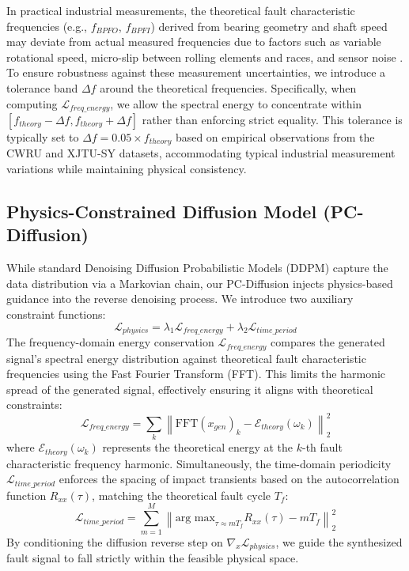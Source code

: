 In practical industrial measurements, the theoretical fault characteristic frequencies (e.g., $f_{BPFO}$, $f_{BPFI}$) derived from bearing geometry and shaft speed may deviate from actual measured frequencies due to factors such as variable rotational speed, micro-slip between rolling elements and races, and sensor noise \cite{randall2011rolling}. To ensure robustness against these measurement uncertainties, we introduce a tolerance band $\Delta f$ around the theoretical frequencies. Specifically, when computing $\mathcal{L}_{freq\_energy}$, we allow the spectral energy to concentrate within $[f_{theory} - \Delta f, f_{theory} + \Delta f]$ rather than enforcing strict equality. This tolerance is typically set to $\Delta f = 0.05 \times f_{theory}$ based on empirical observations from the CWRU and XJTU-SY datasets, accommodating typical industrial measurement variations while maintaining physical consistency.

\subsection{Physics-Constrained Diffusion Model (PC-Diffusion)}
While standard Denoising Diffusion Probabilistic Models (DDPM) \cite{ho2020denoising} capture the data distribution via a Markovian chain, our PC-Diffusion injects physics-based guidance into the reverse denoising process. We introduce two auxiliary constraint functions:
\begin{equation}
    \mathcal{L}_{physics} = \lambda_{1} \mathcal{L}_{freq\_energy} + \lambda_{2} \mathcal{L}_{time\_period}
\end{equation}
The frequency-domain energy conservation $\mathcal{L}_{freq\_energy}$ compares the generated signal's spectral energy distribution against theoretical fault characteristic frequencies using the Fast Fourier Transform (FFT). This limits the harmonic spread of the generated signal, effectively ensuring it aligns with theoretical constraints:
\begin{equation}
    \mathcal{L}_{freq\_energy} = \sum_{k} \left\| \text{FFT}(x_{gen})_k - \mathcal{E}_{theory}(\omega_k) \right\|_2^2
\end{equation}
where $\mathcal{E}_{theory}(\omega_k)$ represents the theoretical energy at the $k$-th fault characteristic frequency harmonic.
Simultaneously, the time-domain periodicity $\mathcal{L}_{time\_period}$ enforces the spacing of impact transients based on the autocorrelation function $R_{xx}(\tau)$, matching the theoretical fault cycle $T_f$:
\begin{equation}
    \mathcal{L}_{time\_period} = \sum_{m=1}^{M} \left\| \text{arg max}_{\tau \approx m T_f} R_{xx}(\tau) - m T_f \right\|_2^2
\end{equation}
By conditioning the diffusion reverse step on $\nabla_x \mathcal{L}_{physics}$, we guide the synthesized fault signal to fall strictly within the feasible physical space.


